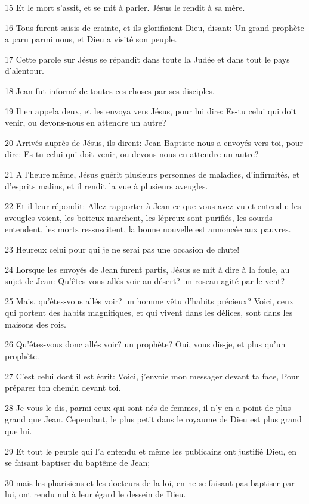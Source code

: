 \par 15 Et le mort s'assit, et se mit à parler. Jésus le rendit à sa mère.
\par 16 Tous furent saisis de crainte, et ils glorifiaient Dieu, disant: Un grand prophète a paru parmi nous, et Dieu a visité son peuple.
\par 17 Cette parole sur Jésus se répandit dans toute la Judée et dans tout le pays d'alentour.
\par 18 Jean fut informé de toutes ces choses par ses disciples.
\par 19 Il en appela deux, et les envoya vers Jésus, pour lui dire: Es-tu celui qui doit venir, ou devons-nous en attendre un autre?
\par 20 Arrivés auprès de Jésus, ils dirent: Jean Baptiste nous a envoyés vers toi, pour dire: Es-tu celui qui doit venir, ou devons-nous en attendre un autre?
\par 21 A l'heure même, Jésus guérit plusieurs personnes de maladies, d'infirmités, et d'esprits malins, et il rendit la vue à plusieurs aveugles.
\par 22 Et il leur répondit: Allez rapporter à Jean ce que vous avez vu et entendu: les aveugles voient, les boiteux marchent, les lépreux sont purifiés, les sourds entendent, les morts ressuscitent, la bonne nouvelle est annoncée aux pauvres.
\par 23 Heureux celui pour qui je ne serai pas une occasion de chute!
\par 24 Lorsque les envoyés de Jean furent partis, Jésus se mit à dire à la foule, au sujet de Jean: Qu'êtes-vous allés voir au désert? un roseau agité par le vent?
\par 25 Mais, qu'êtes-vous allés voir? un homme vêtu d'habits précieux? Voici, ceux qui portent des habits magnifiques, et qui vivent dans les délices, sont dans les maisons des rois.
\par 26 Qu'êtes-vous donc allés voir? un prophète? Oui, vous dis-je, et plus qu'un prophète.
\par 27 C'est celui dont il est écrit: Voici, j'envoie mon messager devant ta face, Pour préparer ton chemin devant toi.
\par 28 Je vous le dis, parmi ceux qui sont nés de femmes, il n'y en a point de plus grand que Jean. Cependant, le plus petit dans le royaume de Dieu est plus grand que lui.
\par 29 Et tout le peuple qui l'a entendu et même les publicains ont justifié Dieu, en se faisant baptiser du baptême de Jean;
\par 30 mais les pharisiens et les docteurs de la loi, en ne se faisant pas baptiser par lui, ont rendu nul à leur égard le dessein de Dieu.
